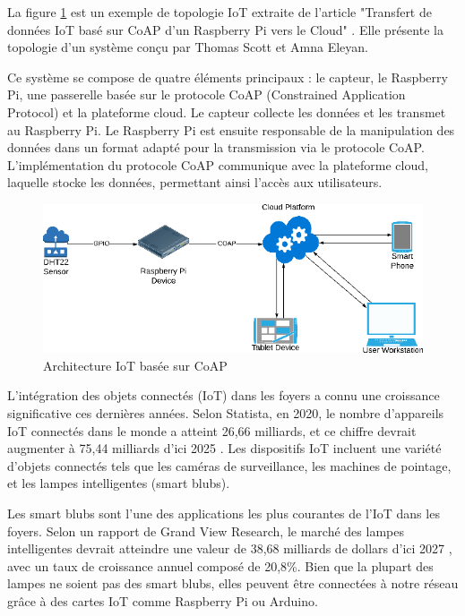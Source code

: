La figure \ref{Chap4.2.1} est un exemple de topologie IoT extraite de l'article "Transfert de données IoT basé sur CoAP d'un Raspberry Pi vers le Cloud" \cite{Scott2019CoAPBI}. Elle présente la topologie d'un système conçu par Thomas Scott et Amna Eleyan.

Ce système se compose de quatre éléments principaux : le capteur, le Raspberry Pi, une passerelle basée sur le protocole CoAP (Constrained Application Protocol) et la plateforme cloud. Le capteur collecte les données et les transmet au Raspberry Pi. Le Raspberry Pi est ensuite responsable de la manipulation des données dans un format adapté pour la transmission via le protocole CoAP. L'implémentation du protocole CoAP communique avec la plateforme cloud, laquelle stocke les données, permettant ainsi l'accès aux utilisateurs.

\begin{figure}[H]
\centering
\includegraphics[width=15cm]{Images/IoT-Topo2.png}
\caption{Architecture IoT basée sur CoAP}
\label{Chap4.2.1}
\end{figure}


L'intégration des objets connectés (IoT) dans les foyers a connu une croissance significative ces dernières années. Selon Statista, en 2020, le nombre d'appareils IoT connectés dans le monde a atteint 26,66 milliards, et ce chiffre devrait augmenter à 75,44 milliards d'ici 2025 \cite{statista-iot-2025}. Les dispositifs IoT incluent une variété d'objets connectés tels que les caméras de surveillance, les machines de pointage, et les lampes intelligentes (smart blubs). 

Les smart blubs sont l'une des applications les plus courantes de l'IoT dans les foyers. Selon un rapport de Grand View Research, le marché des lampes intelligentes devrait atteindre une valeur de 38,68 milliards de dollars d'ici 2027 \cite{market-splash-automation}, avec un taux de croissance annuel composé de 20,8\%. Bien que la plupart des lampes ne soient pas des smart blubs, elles peuvent être connectées à notre réseau grâce à des cartes IoT comme Raspberry Pi ou Arduino.


